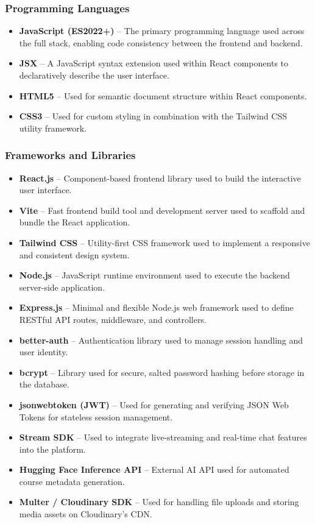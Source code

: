 \subsubsection{Programming Languages}
\begin{itemize}
    \item \textbf{JavaScript (ES2022+)} -- The primary programming language used across the full stack, enabling code consistency between the frontend and backend.
    \item \textbf{JSX} -- A JavaScript syntax extension used within React components to declaratively describe the user interface.
    \item \textbf{HTML5} -- Used for semantic document structure within React components.
    \item \textbf{CSS3} -- Used for custom styling in combination with the Tailwind CSS utility framework.
\end{itemize}

\subsubsection{Frameworks and Libraries}
\begin{itemize}
    \item \textbf{React.js} -- Component-based frontend library used to build the interactive user interface.
    \item \textbf{Vite} -- Fast frontend build tool and development server used to scaffold and bundle the React application.
    \item \textbf{Tailwind CSS} -- Utility-first CSS framework used to implement a responsive and consistent design system.
    \item \textbf{Node.js} -- JavaScript runtime environment used to execute the backend server-side application.
    \item \textbf{Express.js} -- Minimal and flexible Node.js web framework used to define RESTful API routes, middleware, and controllers.
    \item \textbf{better-auth} -- Authentication library used to manage session handling and user identity.
    \item \textbf{bcrypt} -- Library used for secure, salted password hashing before storage in the database.
    \item \textbf{jsonwebtoken (JWT)} -- Used for generating and verifying JSON Web Tokens for stateless session management.
    \item \textbf{Stream SDK} -- Used to integrate live-streaming and real-time chat features into the platform.
    \item \textbf{Hugging Face Inference API} -- External AI API used for automated course metadata generation.
    \item \textbf{Multer / Cloudinary SDK} -- Used for handling file uploads and storing media assets on Cloudinary's CDN.
\end{itemize}

